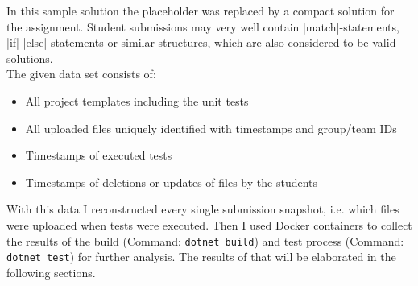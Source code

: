 \noindent In this sample solution the placeholder was replaced by a compact solution for the assignment. Student submissions may very well contain \fsharp|match|-statements,\\
\fsharp|if|-\fsharp|else|-statements or similar structures, which are also considered to be valid solutions.\\[5pt]
The given data set consists of:
\begin{itemize}[nosep]
    \item All project templates including the unit tests
    \item All uploaded files uniquely identified with timestamps and group/team IDs
    \item Timestamps of executed tests
    \item Timestamps of deletions or updates of files by the students
\end{itemize}

\noindent With this data I reconstructed every single submission snapshot, i.e. which files were uploaded when tests were executed.
Then I used Docker containers to collect the results of the build (Command: \texttt{dotnet build}) and test process (Command: \texttt{dotnet test}) for further analysis.
The results of that will be elaborated in the following sections.




